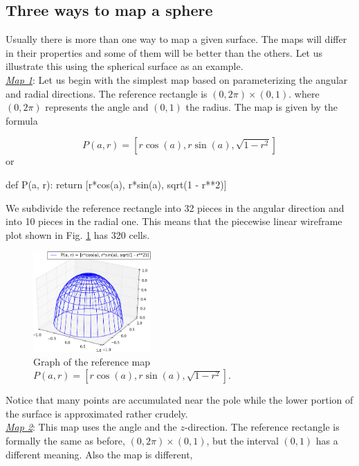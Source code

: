\subsection{Three ways to map a sphere}

Usually there is more than one way to 
map a given surface. The maps will differ in their properties 
and some of them will be better than the others. Let us
illustrate this using the spherical surface as an example. \\

\noindent
\underline{\em Map 1}: Let us begin with the simplest map based on parameterizing 
the angular and radial directions. The reference rectangle is $(0, 2\pi)\times(0, 1)$. 
where $(0, 2\pi)$ represents the angle and $(0, 1)$ the radius. The map is given by the formula

$$
P(a, r) = \left[r\cos(a), r\sin(a), \sqrt{1 - r^2}\right]
$$
or

\begin{bluecode}
def P(a, r):
    return [r*cos(a), r*sin(a), sqrt(1 - r**2)]
\end{bluecode}
We subdivide the reference rectangle into 32 pieces in the angular direction
and into 10 pieces in the radial one. This means that the piecewise linear 
wireframe plot shown in Fig. \ref{fig:paramsu5} has 320 cells. 
\newpage

\begin{figure}[!ht]
\begin{center}
\includegraphics[width=0.4\textwidth]{img/paramsu5.png}
\end{center}
\vspace{-6mm}
\caption{Graph of the reference map $P(a, r) = \left[r\cos(a), r\sin(a), \sqrt{1 - r^2}\right]$.}
\label{fig:paramsu5}
\end{figure}
\noindent
Notice that many points are accumulated near the pole while the lower portion
of the surface is approximated rather crudely. \\

\noindent
\underline{\em Map 2}: This map uses the angle and the $z$-direction. The 
reference rectangle is formally the same as before, $(0, 2\pi)\times(0, 1)$,
but the interval $(0, 1)$ has a different meaning. Also the map is different,

